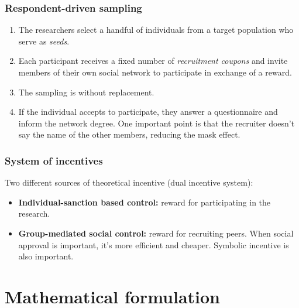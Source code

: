 \documentclass{beamer}
\newcommand{\Space}{\vspace{3ex}}
\begin{document}
\begin{frame}
  
  \frametitle{Respondent-driven sampling}

  \begin{enumerate}
    \justifying
    \item The researchers select a handful of individuals from a target
    population who serve as {\em seeds}.
    \item Each participant receives a fixed number of {\em recruitment coupons} and invite
    members of their own social network to participate in exchange of a
    reward.   
    \item The sampling is without replacement. 
    \item If the individual accepts to participate, they answer a
    questionnaire and inform the network degree. One important point is that
    the recruiter doesn't say the name of the other members, reducing the
    mask effect. 

  \end{enumerate}

\end{frame}

\begin{frame}
  
  \frametitle{System of incentives}
    
  Two different sources of theoretical incentive (dual incentive system):

  \Space

  \begin{itemize}
    \justifying
    \item {\bf Individual-sanction based control:} reward for participating
    in the research. 
    \item {\bf Group-mediated social control:} reward for recruiting peers.
    When social approval is important, it's more efficient and cheaper.
    Symbolic incentive is also important. 
  \end{itemize}

\end{frame}


\section{Mathematical formulation}
\end{document}
